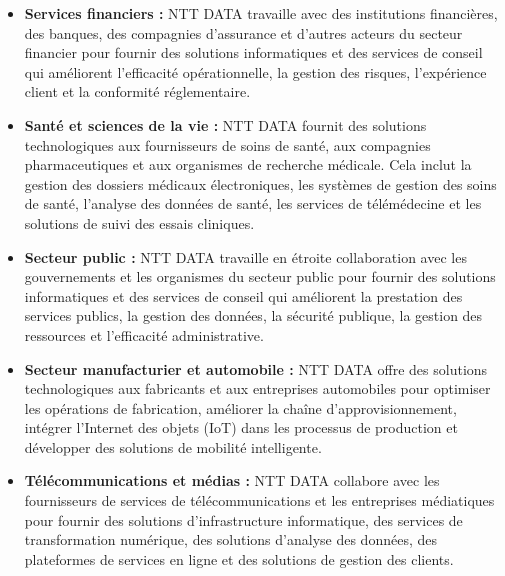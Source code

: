 \documentclass[12pt, a4paper, openany]{report}
\begin{document}
\begin{itemize}
    \setlength{\itemsep}{0.3cm} 
    
    \renewcommand{\labelitemi}{\textcolor{royalBlue}{\rule{1.2ex}{1.2ex}}} 
    
    \vspace{-0.3cm}
    \item \textcolor{primaryBlue}{\textbf{Services financiers :}} NTT DATA travaille avec des institutions financières, des banques, des compagnies d'assurance et d'autres acteurs du secteur financier pour fournir des solutions informatiques et des services de conseil qui améliorent l'efficacité opérationnelle, la gestion des risques, l'expérience client et la conformité réglementaire.
    
    \vspace{-0.3cm}
    \item \textcolor{primaryBlue}{\textbf{Santé et sciences de la vie :}} NTT DATA fournit des solutions technologiques aux fournisseurs de soins de santé, aux compagnies pharmaceutiques et aux organismes de recherche médicale. Cela inclut la gestion des dossiers médicaux électroniques, les systèmes de gestion des soins de santé, l'analyse des données de santé, les services de télémédecine et les solutions de suivi des essais cliniques.

    \vspace{-0.3cm}
    \item \textcolor{primaryBlue}{\textbf{Secteur public :}} NTT DATA travaille en étroite collaboration avec les gouvernements et les organismes du secteur public pour fournir des solutions informatiques et des services de conseil qui améliorent la prestation des services publics, la gestion des données, la sécurité publique, la gestion des ressources et l'efficacité administrative.

    \vspace{-0.3cm}
    \item \textcolor{primaryBlue}{\textbf{Secteur manufacturier et automobile :}} NTT DATA offre des solutions technologiques aux fabricants et aux entreprises automobiles pour optimiser les opérations de fabrication, améliorer la chaîne d'approvisionnement, intégrer l'Internet des objets (IoT) dans les processus de production et développer des solutions de mobilité intelligente.

    \vspace{-0.3cm}
    \item \textcolor{primaryBlue}{\textbf{Télécommunications et médias :}} NTT DATA collabore avec les fournisseurs de services de télécommunications et les entreprises médiatiques pour fournir des solutions d'infrastructure informatique, des services de transformation numérique, des solutions d'analyse des données, des plateformes de services en ligne et des solutions de gestion des clients.
\end{itemize}
\end{document}
